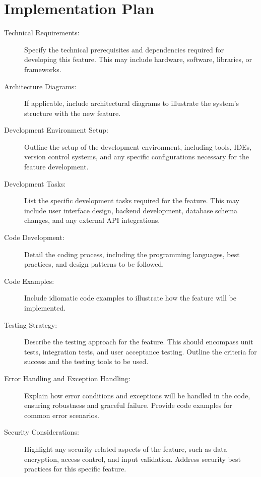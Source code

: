 \documentclass{article}
\begin{document}
\section{Implementation Plan}
\begin{description}
    \item[Technical Requirements:]
    Specify the technical prerequisites and dependencies required for developing this feature. This may include hardware, software, libraries, or frameworks.

    \item[Architecture Diagrams:] If applicable, include architectural diagrams to illustrate the system's structure with the new feature.

    \item[Development Environment Setup:]
    Outline the setup of the development environment, including tools, IDEs, version control systems, and any specific configurations necessary for the feature development.

    \item[Development Tasks:]
    List the specific development tasks required for the feature. This may include user interface design, backend development, database schema changes, and any external API integrations.

    \item[Code Development:]
    Detail the coding process, including the programming languages, best practices, and design patterns to be followed.
    
    \item[Code Examples:] Include idiomatic code examples to illustrate how the feature will be implemented.

    \item[Testing Strategy:]
    Describe the testing approach for the feature. This should encompass unit tests, integration tests, and user acceptance testing. Outline the criteria for success and the testing tools to be used.

    \item[Error Handling and Exception Handling:]
    Explain how error conditions and exceptions will be handled in the code, ensuring robustness and graceful failure. Provide code examples for common error scenarios.

    \item[Security Considerations:]
    Highlight any security-related aspects of the feature, such as data encryption, access control, and input validation. Address security best practices for this specific feature.


\end{description}
\end{document}
